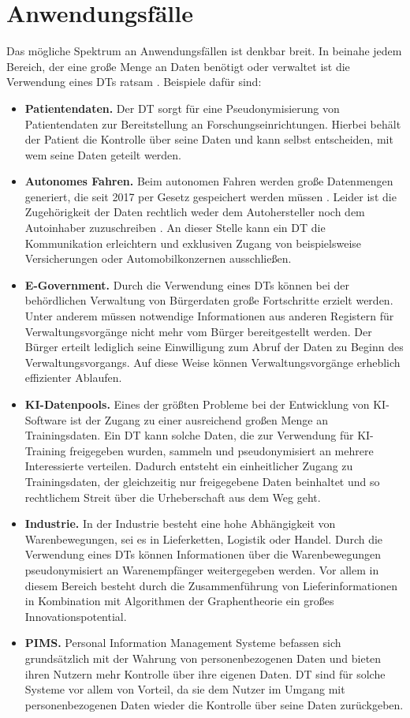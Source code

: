 \documentclass[
	fontsize=11pt,
	headings=small,
	parskip=half,           %
	bibliography=totoc,
	numbers=noenddot,       %
	open=any,               %
]{scrreprt}
\begin{document}
\section{Anwendungsfälle}
\label{sec:dt-usecases}
Das mögliche Spektrum an Anwendungsfällen ist denkbar breit. In beinahe jedem Bereich, der eine große Menge an Daten benötigt oder verwaltet ist die Verwendung eines DTs ratsam \cite{dt-blankertz2021regulierung,dt-blankertz2021neue, dt-bundesdruckereiDatentreuhänder}. Beispiele dafür sind:
\begin{itemize}
    \item \textbf{Patientendaten.} Der DT sorgt für eine Pseudonymisierung von Patientendaten zur Bereitstellung an Forschungseinrichtungen. Hierbei behält der Patient die Kontrolle über seine Daten und kann selbst entscheiden, mit wem seine Daten geteilt werden.
    \item \textbf{Autonomes Fahren.} Beim autonomen Fahren werden große Datenmengen generiert, die seit 2017 per Gesetz gespeichert werden müssen \cite{dt-bundesdruckereiDatentreuhänder}. Leider ist die Zugehörigkeit der Daten rechtlich weder dem Autohersteller noch dem Autoinhaber zuzuschreiben \cite{dt-richter2020ddvtalk}. An dieser Stelle kann ein DT die Kommunikation erleichtern und exklusiven Zugang von beispielsweise Versicherungen oder Automobilkonzernen ausschließen.
    \item \textbf{E-Government.} Durch die Verwendung eines DTs können bei der behördlichen Verwaltung von Bürgerdaten große Fortschritte erzielt werden. Unter anderem müssen notwendige Informationen aus anderen Registern für Verwaltungsvorgänge nicht mehr vom Bürger bereitgestellt werden. Der Bürger erteilt lediglich seine Einwilligung zum Abruf der Daten zu Beginn des Verwaltungsvorgangs. Auf diese Weise können Verwaltungsvorgänge erheblich effizienter Ablaufen.
    \item \textbf{KI-Datenpools.} Eines der größten Probleme bei der Entwicklung von KI-Software ist der Zugang zu einer ausreichend großen Menge an Trainingsdaten. Ein DT kann solche Daten, die zur Verwendung für KI-Training freigegeben wurden, sammeln und pseudonymisiert an mehrere Interessierte verteilen. Dadurch entsteht ein einheitlicher Zugang zu Trainingsdaten, der gleichzeitig nur freigegebene Daten beinhaltet und so rechtlichem Streit über die Urheberschaft aus dem Weg geht.
    \item \textbf{Industrie.} In der Industrie besteht eine hohe Abhängigkeit von Warenbewegungen, sei es in Lieferketten, Logistik oder Handel. Durch die Verwendung eines DTs können Informationen über die Warenbewegungen pseudonymisiert an Warenempfänger weitergegeben werden. Vor allem in diesem Bereich besteht durch die Zusammenführung von Lieferinformationen in Kombination mit Algorithmen der Graphentheorie ein großes Innovationspotential.
    \item \textbf{PIMS.} Personal Information Management Systeme befassen sich grundsätzlich mit der Wahrung von personenbezogenen Daten und bieten ihren Nutzern mehr Kontrolle über ihre eigenen Daten. DT sind für solche Systeme vor allem von Vorteil, da sie dem Nutzer im Umgang mit personenbezogenen Daten wieder die Kontrolle über seine Daten zurückgeben.
\end{itemize}
\end{document}
